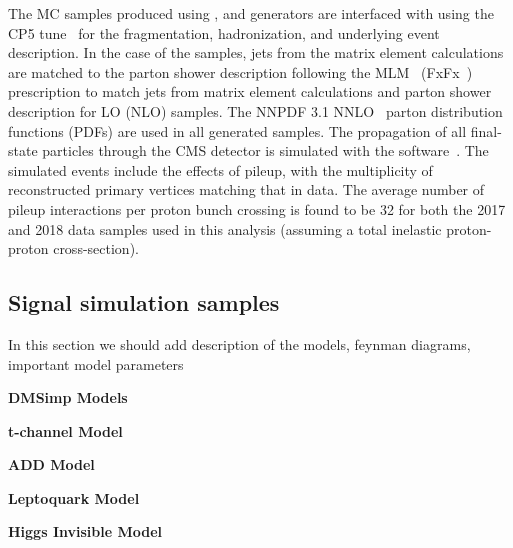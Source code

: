 The MC samples produced using \MGvATNLO, and \POWHEG
generators are interfaced with \PYTHIA using the CP5 tune~\cite{Sirunyan:2019dfx}
for the fragmentation, hadronization, and underlying event description.
In the case of the \MGvATNLO samples, jets from the matrix element calculations
are matched to the parton shower description following the MLM~\cite{Mangano:2006rw} (FxFx~\cite{Frederix:2012ps})
prescription to match jets from matrix element calculations and parton shower description for LO (NLO) samples.
The NNPDF 3.1 NNLO~\cite{Ball:2017nwa}
parton distribution functions (PDFs) are used in all generated samples.
The propagation of all final-state particles through the CMS detector
is simulated with the  software~\cite{Agostinelli:2002hh}.
The simulated events include the effects of pileup, with the multiplicity of reconstructed primary
vertices matching that in data. The average number of pileup interactions per proton bunch crossing
is found to be 32 for both the 2017 and 2018 data samples used in this analysis (assuming a total inelastic proton-proton cross-section).

\subsection{Signal simulation samples}

{\color{red} In this section we should add description of the models, feynman diagrams, important model parameters}

{\color{red} {\bf DMSimp Models}}

{\color{red} {\bf t-channel Model}}

{\color{red} {\bf ADD Model}}

{\color{red} {\bf Leptoquark Model}}

{\color{red} {\bf Higgs Invisible Model}}
